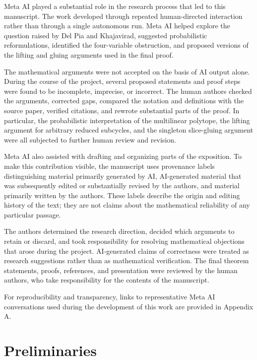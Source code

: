 \documentclass[11pt]{article}
\theoremstyle{definition}
\theoremstyle{remark}
\begin{document}
\begin{humanblock}
Meta AI played a substantial role in the research process that led to this manuscript. The work developed through repeated human-directed interaction rather than through a single autonomous run. Meta AI helped explore the question raised by Del Pia and Khajavirad, suggested probabilistic reformulations, identified the four-variable obstruction, and proposed versions of the lifting and gluing arguments used in the final proof.

The mathematical arguments were not accepted on the basis of AI output alone. During the course of the project, several proposed statements and proof steps were found to be incomplete, imprecise, or incorrect. The human authors checked the arguments, corrected gaps, compared the notation and definitions with the source paper, verified citations, and rewrote substantial parts of the proof. In particular, the probabilistic interpretation of the multilinear polytope, the lifting argument for arbitrary reduced subcycles, and the singleton slice-gluing argument were all subjected to further human review and revision.

Meta AI also assisted with drafting and organizing parts of the exposition. To make this contribution visible, the manuscript uses provenance labels distinguishing material primarily generated by AI, AI-generated material that was subsequently edited or substantially revised by the authors, and material primarily written by the authors. These labels describe the origin and editing history of the text; they are not claims about the mathematical reliability of any particular passage.

The authors determined the research direction, decided which arguments to retain or discard, and took responsibility for resolving mathematical objections that arose during the project. AI-generated claims of correctness were treated as research suggestions rather than as mathematical verification. The final theorem statements, proofs, references, and presentation were reviewed by the human authors, who take responsibility for the contents of the manuscript.

For reproducibility and transparency, links to representative Meta AI conversations used during the development of this work are provided in Appendix A.
\end{humanblock}



\section{Preliminaries}
\end{document}
